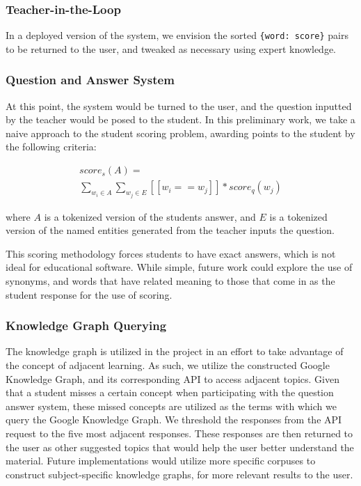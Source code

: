 \documentclass[11pt,a4paper]{article}
\begin{document}
\subsubsection{Teacher-in-the-Loop}
In a deployed version of the system, we envision the sorted \texttt{\{word: score\}} pairs to be returned to the user, and tweaked as necessary using expert knowledge.


\subsubsection{Question and Answer System}
At this point, the system would be turned to the user, and the question inputted by the teacher would be posed to the student. In this preliminary work, we take a naive approach to the student scoring problem, awarding points to the student by the following criteria:

\begin{center}
    \begin{align}
        score_s(A) =\\
        \sum_{w_i \in A} \sum_{w_j \in E}[[w_i==w_j]]* score_q(w_j)
	\end{align}
\end{center}

where $A$ is a tokenized version of the students answer, and $E$ is a tokenized version of the named entities generated from the teacher inputs the question.

This scoring methodology forces students to have exact answers, which is not ideal for educational software. While simple, future work could explore the use of synonyms, and words that have related meaning to those that come in as the student response for the use of scoring.

\subsubsection{Knowledge Graph Querying} 
The knowledge graph is utilized in the project in an effort to take advantage of the concept of adjacent learning. As such, we utilize the constructed Google Knowledge Graph, and its corresponding API to access adjacent topics. Given that a student misses a certain concept when participating with the question answer system, these missed concepts are utilized as the terms with which we query the Google Knowledge Graph. We threshold the responses from the API request to the five most adjacent responses. These responses are then returned to the user as other suggested topics that would help the user better understand the material. Future implementations would utilize more specific corpuses to construct subject-specific knowledge graphs, for more relevant results to the user.
\end{document}
